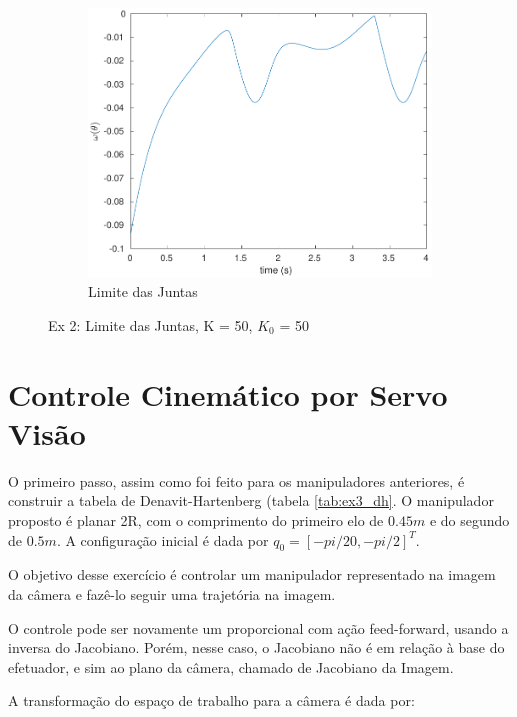 \documentclass[a4paper,11pt]{article}
\theoremstyle{mytheor}
\begin{document}
\begin{figure}[!ht]
\begin{minipage}{\linewidth}
    \begin{subfigure}[b]{0.49\textwidth}
    \includegraphics[width=1\textwidth]{figs/ex2_2b_lim_jun.pdf}
    \caption{Limite das Juntas}
    \label{fig:ex2_2b_manip}
    \end{subfigure}
  \end{minipage}
\caption{Ex 2: Limite das Juntas, K = 50, $K_0$ = 50}
\label{fig:ex2_2b}
\end{figure}

\pagebreak

\section{Controle Cinemático por Servo Visão}

O primeiro passo, assim como foi feito para os manipuladores anteriores, é construir a tabela de Denavit-Hartenberg (tabela \ref{tab:ex3_dh}. O manipulador proposto é planar 2R, com o comprimento do primeiro elo de $0.45m$ e do segundo de $0.5m$. A configuração inicial é dada por $q_0 = [-pi/20, -pi/2]^T$.

O objetivo desse exercício é controlar um manipulador representado na imagem da câmera e fazê-lo seguir uma trajetória na imagem.

O controle pode ser novamente um proporcional com ação feed-forward, usando a inversa do Jacobiano. Porém, nesse caso, o Jacobiano não é em relação à base do efetuador, e sim ao plano da câmera, chamado de Jacobiano da Imagem.

A transformação do espaço de trabalho para a câmera é dada por:
\end{document}
